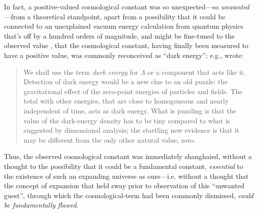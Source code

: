 \documentclass[12 pt]{article}
\begin{document}
In fact, a positive-valued cosmological constant was so unexpected---so \textit{unwanted}---from a theoretical standpoint, apart from a possibility that it could be connected to an unexplained vacuum energy calculation from quantum physics that's off by a hundred orders of magnitude, and might be fine-tuned to the observed value \citep{Weinberg1989,Carroll1992}, that the cosmological constant, having finally been measured to have a positive value, was commonly reconceived as ``dark energy''; e.g., \citet{Peebles2003} wrote:
\begin{quote}
We shall use the term \textit{dark energy} for $\Lambda$ or a component that acts like it. Detection of dark energy would be a new clue to an old puzzle: the gravitational effect of the zero-point energies of particles and fields. The total with other energies, that are close to homogeneous and nearly independent of time, acts as dark energy. What is puzzling is that the value of the dark-energy density has to be tiny compared to what is suggested by dimensional analysis; the startling new evidence is that it may be different from the only other natural value, zero.
\end{quote}
Thus, the observed cosmological constant was immediately shanghaied, without a thought to the possibility that it could be a fundamental constant, \textit{essential} to the existence of such an expanding universe as ours---i.e. without a thought that the concept of expansion that held sway prior to observation of this ``unwanted guest'', through which the cosmological-term had been commonly dismissed, \textit{could be fundamentally flawed}. 
\end{document}
